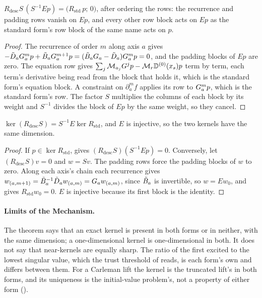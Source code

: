 \begin{proposition}
\label{prop:substitution-identity}
$R_{\mathrm{desc}}S\,(S^{-1}Ep)=\bigl(R_{\mathrm{std}}\,p;\,0\bigr)$, after ordering the rows: the recurrence and padding rows vanish on $Ep$, and every other row block acts on $Ep$ as the standard form's row block of the same name acts on $p$.
\end{proposition}
\begin{proof}
The recurrence of order $m$ along axis $a$ gives $-\tilde{D}_aG_a^mp+\tilde{B}_aG_a^{m+1}p=(\tilde{B}_aG_a-\tilde{D}_a)G_a^mp=0$, and the padding blocks of $Ep$ are zero. The equation row gives $\sum_j\mathcal{M}_{a_j}G^jp-\mathcal{M}_r\mathbb{D}^{(0)}(x_s)p$ term by term, each term's derivative being read from the block that holds it, which is the standard form's equation block. A constraint on $\partial_a^mf$ applies its row to $G_a^mp$, which is the standard form's row. The factor $S$ multiplies the columns of each block by its weight and $S^{-1}$ divides the block of $Ep$ by the same weight, so they cancel.
\end{proof}

\begin{theorem}
\label{thm:kernel-equivalence-general}
$\ker(R_{\mathrm{desc}}S)=S^{-1}E\ker R_{\mathrm{std}}$, and $E$ is injective, so the two kernels have the same dimension.
\end{theorem}
\begin{proof}
If $p\in\ker R_{\mathrm{std}}$,  gives $(R_{\mathrm{desc}}S)(S^{-1}Ep)=0$. Conversely, let $(R_{\mathrm{desc}}S)v=0$ and $w=Sv$. The padding rows force the padding blocks of $w$ to zero. Along each axis's chain each recurrence gives $w_{(a,m+1)}=\tilde{B}_a^{-1}\tilde{D}_aw_{(a,m)}=G_aw_{(a,m)}$, since $\tilde{B}_a$ is invertible, so $w=Ew_0$, and  gives $R_{\mathrm{std}}w_0=0$. $E$ is injective because its first block is the identity.
\end{proof}

\paragraph{Limits of the Mechanism.} The theorem says that an exact kernel is present in both forms or in neither, with the same dimension; a one-dimensional kernel is one-dimensional in both. It does not say that near-kernels are equally sharp. The ratio of the first excited to the lowest singular value, which the trust threshold of  reads, is each form's own and differs between them. For a Carleman lift the kernel is the truncated lift's in both forms, and its uniqueness is the initial-value problem's, not a property of either form ().

